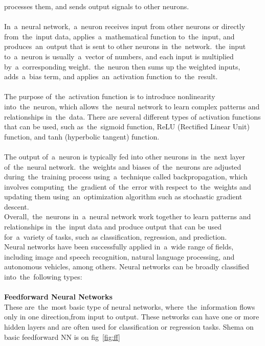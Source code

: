 processes them, and sends output signals to other neurons.\\
\\
In~a~neural network,~a~neuron receives input from other neurons or directly from~the~input data, applies~a~mathematical
function to~the~input, and produces~an~output that is sent to other neurons in~the~network.~the~input to~a~neuron is
usually~a~vector of numbers, and each input is multiplied by~a~corresponding weight.~the~neuron then sums up the
weighted inputs, adds~a~bias term, and applies~an~activation function to~the~result.\\
\\
The purpose of~the~activation function is to introduce nonlinearity into~the~neuron, which allows~the~neural network
to learn complex patterns and relationships in~the~data. There are several different types of activation functions
that can be used, such as~the~sigmoid function, ReLU (Rectified Linear Unit) function, and tanh (hyperbolic tangent)
function.\\
\\
The output of~a~neuron is typically fed into other neurons in~the~next layer of~the~neural network.~the~weights and
biases of~the~neurons are adjusted during~the~training process using~a~technique called backpropagation, which involves
computing~the~gradient of~the~error with respect to~the~weights and updating them using~an~optimization algorithm such
as stochastic gradient descent.\\
Overall,~the~neurons in~a~neural network work together to learn patterns and relationships in~the~input data and produce
output that can be used for~a~variety of tasks, such as classification, regression, and prediction.\\
Neural networks have been successfully applied in~a~wide range of fields, including image and speech recognition, natural language processing, and autonomous vehicles, among others.
Neural networks can be broadly classified into~the~following types:\\
\\
\textbf{Feedforward Neural Networks}\\
These are~the~most basic type of neural networks, where~the~information flows
only in one direction,from input to output. These networks can have one or more hidden layers and are often used for classification or regression tasks. Shema on basic feedforward NN is on fig~\ref{fig:ff}

